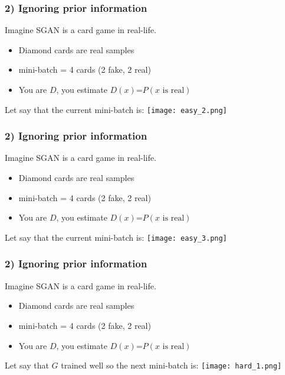 \documentclass[t]{beamer}
\begin{document}

\begin{frame}
	\frametitle{2) Ignoring prior information}
	
	Imagine SGAN is a card game in real-life. 
	\begin{itemize}
		\item Diamond cards are real samples
		\item mini-batch = 4 cards (2 fake, 2 real)
		\item You are $D$, you estimate $D(x)$=$P(x \text{ is real})$
	\end{itemize} \vspace{.10cm}
	Let say that the current mini-batch is:
	\centering
	\texttt{[image: easy\_2.png]}
\end{frame}


\begin{frame}
	\frametitle{2) Ignoring prior information}
	
	Imagine SGAN is a card game in real-life. 
	\begin{itemize}
		\item Diamond cards are real samples
		\item mini-batch = 4 cards (2 fake, 2 real)
		\item You are $D$, you estimate $D(x)$=$P(x \text{ is real})$
	\end{itemize} \vspace{.10cm}
	Let say that the current mini-batch is:
	\centering
	\texttt{[image: easy\_3.png]}
\end{frame}


\begin{frame}
	\frametitle{2) Ignoring prior information}
	
	Imagine SGAN is a card game in real-life. 
	\begin{itemize}
		\item Diamond cards are real samples
		\item mini-batch = 4 cards (2 fake, 2 real)
		\item You are $D$, you estimate $D(x)$=$P(x \text{ is real})$
	\end{itemize} \vspace{.10cm}
	Let say that $G$ trained well so the next mini-batch is:
	\centering
	\texttt{[image: hard\_1.png]}
\end{frame}
\end{document}
